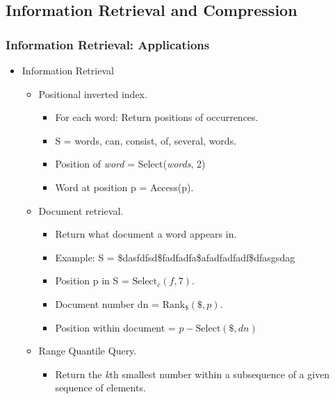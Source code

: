\documentclass{beamer}
\begin{document}
\subsection{Information Retrieval and Compression}
\begin{frame}
\frametitle{Information Retrieval: Applications}
\begin{itemize}
\setlength\itemsep{1em}
\item Information Retrieval
	\begin{itemize}
	\setlength\itemsep{1em}
	\item Positional inverted index.
	\begin{itemize}
	\item For each word: Return positions of occurrences.
	\item S = words, can, consist, of, several, words.
	\item Position of \textit{word} = Select(\textit{words}, 2)
	\item Word at position p = Access(p).
	\end{itemize}
	\item Document retrieval.
	\begin{itemize}
	\item Return what document a word appears in.
	\item Example: S = \$dasfdfsd\$fadfadfa\$afadfadfadf\$dfasgsdag
	\item Position p in S = $\text{Select}_c(f,7)$.
	\item Document number dn = $\text{Rank}_\$(\$, p)$.
	\item Position within document = $p - \text{Select}(\$, dn)$
	\end{itemize}
	\item Range Quantile Query.
	\begin{itemize}
	\item Return the \textit{k}th smallest number within a subsequence of a given sequence of elements.
	\end{itemize}		 
	\end{itemize}
\end{itemize}
\end{frame}
\end{document}
